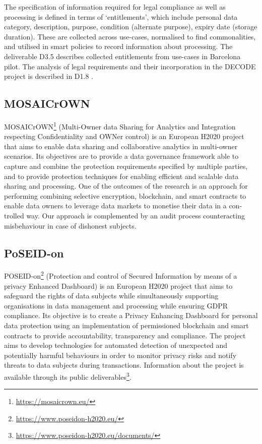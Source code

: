 The specification of information required for legal compliance as well as processing is defined in terms of `entitlements', which include personal data category, description, purpose, condition (alternate purpose), expiry date (storage duration). These are collected across use-cases, normalised to find commonalities, and utilised in smart policies to record information about processing. The deliverable D3.5 \cite{roio_d3.5_2018} describes collected entitlements from use-cases in Barcelona pilot.
The analysis of legal requirements and their incorporation in the DECODE project is described in D1.8 \cite{noauthor_d1.8_2017}.
\subsection*{MOSAICrOWN}
MOSAICrOWN\footnote{\url{https://mosaicrown.eu/}} (Multi-Owner data Sharing for Analytics and Integration respecting Confidentiality and OWNer control) is an European H2020 project that aims to enable data sharing and collaborative analytics in multi-owner scenarios. Its objectives are to provide a data governance framework able to capture and combine the protection requirements specified by multiple parties, and to provide protection techniques for enabling efficient and scalable data sharing and processing.
One of the outcomes of the research is an approach for performing combining selective encryption, blockchain, and smart contracts to enable data owners to leverage data markets to monetise their data in a con-trolled way. Our approach is complemented by an audit process counteracting misbehaviour in case of dishonest subjects.

\subsection*{PoSEID-on}
POSEID-on\footnote{\url{https://www.poseidon-h2020.eu/}} (Protection and control of Secured Information by means of a privacy Enhanced Dashboard) is an European H2020 project that aims to safeguard the rights of data subjects
while simultaneously supporting organisations in data management and processing while ensuring GDPR compliance.
Its objective is to create a Privacy Enhancing Dashboard for personal data protection using an implementation of permissioned blockchain and smart contracts to provide accountability, transparency and compliance.
The project aims to develop technologies for automated detection of unexpected and potentially harmful behaviours in order to monitor privacy risks and notify threats to data subjects during transactions.
Information about the project is available through its public deliverables\footnote{\url{https://www.poseidon-h2020.eu/documents/}}.

